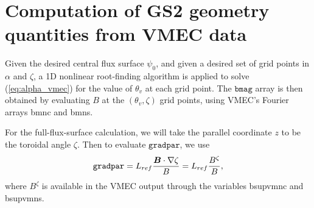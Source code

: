 \documentclass[11pt,letter]{article}
\newcommand{\vect}[1]{\mbox{\boldmath $#1$}}
\newcommand{\bmag}{\mathtt{bmag}}
\newcommand{\gradpar}{\mathtt{gradpar}}
\begin{document}

\section{Computation of GS2 geometry quantities from VMEC data} 


Given the desired central flux surface $\psi_0$, and given a desired set of grid points in $\alpha$ and $\zeta$, 
a 1D nonlinear root-finding algorithm is applied to solve (\ref{eq:alpha_vmec}) for the 
value of $\theta_v$ at each grid point. The $\bmag$ array is then obtained by evaluating $B$
at the $(\theta_v, \zeta)$ grid points, using VMEC's Fourier arrays {\ttfamily bmnc} and {\ttfamily bmns}.

For the full-flux-surface calculation, we will take the parallel coordinate $z$ to be the toroidal angle $\zeta$.
Then to evaluate $\gradpar$, we use
\begin{equation}
\gradpar = L_{ref} \frac{\vect{B}\cdot\nabla\zeta}{B} = L_{ref} \frac{B^\zeta}{B},
\end{equation}
where $B^\zeta$ is available in the VMEC output through the variables {\ttfamily bsupvmnc} and {\ttfamily bsupvmns}.
\end{document}
